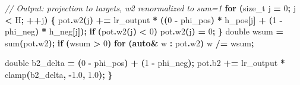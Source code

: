 \documentclass[
  11pt,
  a4paper,
]{article}
\newenvironment{Shaded}{\begin{snugshade}}{\end{snugshade}}
\newcommand{\CommentTok}[1]{\textcolor[rgb]{0.56,0.35,0.01}{\textit{#1}}}
\newcommand{\ControlFlowTok}[1]{\textcolor[rgb]{0.13,0.29,0.53}{\textbf{#1}}}
\newcommand{\DataTypeTok}[1]{\textcolor[rgb]{0.13,0.29,0.53}{#1}}
\newcommand{\DecValTok}[1]{\textcolor[rgb]{0.00,0.00,0.81}{#1}}
\newcommand{\FloatTok}[1]{\textcolor[rgb]{0.00,0.00,0.81}{#1}}
\newcommand{\KeywordTok}[1]{\textcolor[rgb]{0.13,0.29,0.53}{\textbf{#1}}}
\newcommand{\NormalTok}[1]{#1}
\newcommand{\OperatorTok}[1]{\textcolor[rgb]{0.81,0.36,0.00}{\textbf{#1}}}
\begin{document}
\begin{Shaded}
\begin{Highlighting}[]
    \CommentTok{// Output: projection to targets, w2 renormalized to sum=1}
    \ControlFlowTok{for} \OperatorTok{(}\DataTypeTok{size\_t}\NormalTok{ j }\OperatorTok{=} \DecValTok{0}\OperatorTok{;}\NormalTok{ j }\OperatorTok{\textless{}}\NormalTok{ H}\OperatorTok{;} \OperatorTok{++}\NormalTok{j}\OperatorTok{)} \OperatorTok{\{}
\NormalTok{        pot}\OperatorTok{.}\NormalTok{w2}\OperatorTok{(}\NormalTok{j}\OperatorTok{)} \OperatorTok{+=}\NormalTok{ lr\_output }\OperatorTok{*} \OperatorTok{((}\DecValTok{0} \OperatorTok{{-}}\NormalTok{ phi\_pos}\OperatorTok{)} \OperatorTok{*}\NormalTok{ h\_pos}\OperatorTok{[}\NormalTok{j}\OperatorTok{]} \OperatorTok{+} \OperatorTok{(}\DecValTok{1} \OperatorTok{{-}}\NormalTok{ phi\_neg}\OperatorTok{)} \OperatorTok{*}\NormalTok{ h\_neg}\OperatorTok{[}\NormalTok{j}\OperatorTok{]);}
        \ControlFlowTok{if} \OperatorTok{(}\NormalTok{pot}\OperatorTok{.}\NormalTok{w2}\OperatorTok{(}\NormalTok{j}\OperatorTok{)} \OperatorTok{\textless{}} \DecValTok{0}\OperatorTok{)}\NormalTok{ pot}\OperatorTok{.}\NormalTok{w2}\OperatorTok{(}\NormalTok{j}\OperatorTok{)} \OperatorTok{=} \DecValTok{0}\OperatorTok{;}
    \OperatorTok{\}}
    \DataTypeTok{double}\NormalTok{ wsum }\OperatorTok{=}\NormalTok{ sum}\OperatorTok{(}\NormalTok{pot}\OperatorTok{.}\NormalTok{w2}\OperatorTok{);}
    \ControlFlowTok{if} \OperatorTok{(}\NormalTok{wsum }\OperatorTok{\textgreater{}} \DecValTok{0}\OperatorTok{)} \ControlFlowTok{for} \OperatorTok{(}\KeywordTok{auto}\OperatorTok{\&}\NormalTok{ w }\OperatorTok{:}\NormalTok{ pot}\OperatorTok{.}\NormalTok{w2}\OperatorTok{)}\NormalTok{ w }\OperatorTok{/=}\NormalTok{ wsum}\OperatorTok{;}

    \DataTypeTok{double}\NormalTok{ b2\_delta }\OperatorTok{=} \OperatorTok{(}\DecValTok{0} \OperatorTok{{-}}\NormalTok{ phi\_pos}\OperatorTok{)} \OperatorTok{+} \OperatorTok{(}\DecValTok{1} \OperatorTok{{-}}\NormalTok{ phi\_neg}\OperatorTok{);}
\NormalTok{    pot}\OperatorTok{.}\NormalTok{b2 }\OperatorTok{+=}\NormalTok{ lr\_output }\OperatorTok{*}\NormalTok{ clamp}\OperatorTok{(}\NormalTok{b2\_delta}\OperatorTok{,} \OperatorTok{{-}}\FloatTok{1.0}\OperatorTok{,} \FloatTok{1.0}\OperatorTok{);}
\OperatorTok{\}}


\end{Highlighting}
\end{Shaded}
\end{document}

